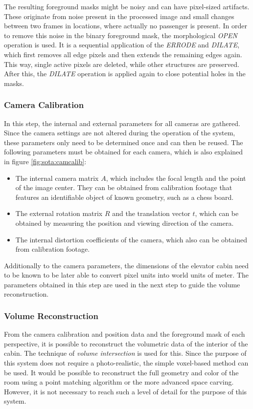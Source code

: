 The resulting foreground masks might be noisy and can have pixel-sized artifacts.
These originate from noise present in the processed image and small changes between two frames in locations, where actually no passenger is present. 
In order to remove this noise in the binary foreground mask, the morphological \emph{OPEN} operation is used. 
It is a sequential application of the \emph{ERRODE} and \emph{DILATE}, which first removes all edge pixels and then extends the remaining edges again.
This way, single active pixels are deleted, while other structures are preserved.
After this, the \emph{DILATE} operation is applied again to close potential holes in the masks.

\subsubsection{Camera Calibration}
In this step, the internal and external parameters for all cameras are gathered.
Since the camera settings are not altered during the operation of the system, these parameters only need to be determined once and can then be reused.
The following parameters must be obtained for each camera, which is also explained in figure \ref{fig:sota:camcalib}:
\begin{itemize}
    \item The internal camera matrix $ A $, which includes the focal length and the point of the image center. They can be obtained from calibration footage that features an identifiable object of known geometry, such as a chess board.
    \item The external rotation matrix $ R $ and the translation vector $ t $, which can be obtained by measuring the position and viewing direction of the camera.
    \item The internal distortion coefficients of the camera, which also can be obtained from calibration footage.
\end{itemize}

Additionally to the camera parameters, the dimensions of the elevator cabin need to be known to be later able to convert pixel units into world units of meter.
The parameters obtained in this step are used in the next step to guide the volume reconstruction.

\subsubsection{Volume Reconstruction}

From the camera calibration and position data and the foreground mask of each perspective, 
it is possible to reconstruct the volumetric data of the interior of the cabin.
The technique of \emph{volume intersection} is used for this.
Since the purpose of this system does not require a photo-realistic, the simple voxel-based method can be used.
It would be possible to reconstruct the full geometry and color of the room using a point matching algorithm or the more advanced space carving. 
However, it is not necessary to reach such a level of detail for the purpose of this system.

